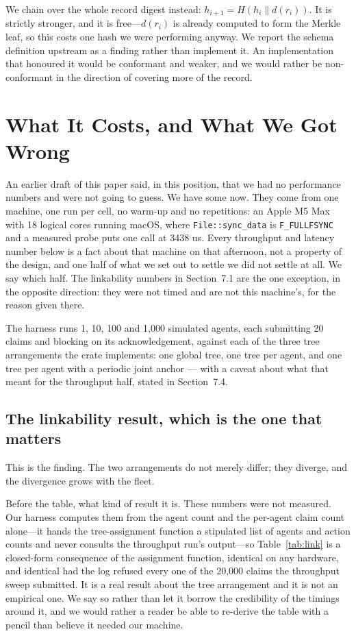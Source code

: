 \documentclass[11pt]{article}
\begin{document}
We chain over the whole record digest instead:
$h_{i+1} = H(h_i \| d(r_i))$. It is strictly stronger, and it is free---$d(r_i)$
is already computed to form the Merkle leaf, so this costs one hash we were
performing anyway. We report the schema definition upstream as a finding rather
than implement it. An implementation that honoured it would be conformant and
weaker, and we would rather be non-conformant in the direction of covering more
of the record.

\section{What It Costs, and What We Got Wrong}
\label{sec:measure}

An earlier draft of this paper said, in this position, that we had no
performance numbers and were not going to guess. We have some now. They come
from one machine, one run per cell, no warm-up and no repetitions: an Apple M5
Max with 18 logical cores running macOS, where \texttt{File::sync\_data} is
\texttt{F\_FULLFSYNC} and a measured probe puts one call at
3438 us. Every throughput and latency number below is a fact about
that machine on that afternoon, not a property of the design, and one half of
what we set out to settle we did not settle at all. We say which
half. The linkability numbers in Section~7.1 are the one exception, in the
opposite direction: they were not timed and are not this machine's, for the
reason given there.

The harness runs 1, 10, 100 and 1{,}000 simulated agents, each submitting 20
claims and blocking on its acknowledgement, against each of the three tree
arrangements the crate implements: one global tree, one tree per agent, and
one tree per agent with a periodic joint anchor --- with a caveat about what
that meant for the throughput half, stated in Section~7.4.

\subsection{The linkability result, which is the one that matters}

This is the finding. The two arrangements do not merely differ; they diverge,
and the divergence grows with the fleet.

Before the table, what kind of result it is. These numbers were not measured.
Our harness computes them from the agent count and the per-agent claim count
alone---it hands the tree-assignment function a stipulated list of agents and
action counts and never consults the throughput run's output---so
Table~\ref{tab:link} is a closed-form consequence of the assignment function,
identical on any hardware, and identical had the log refused every one of the
20,000 claims the throughput sweep submitted. It is a real result about the
tree arrangement and it is not an empirical one. We say so rather than let it
borrow the credibility of the timings around it, and we would rather a reader
be able to re-derive the table with a pencil than believe it needed our
machine.
\end{document}
